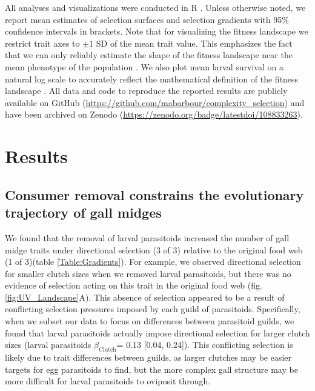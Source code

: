 \documentclass[11pt,]{article}
\begin{document}
All analyses and visualizations were conducted in R \citep{R2018}.
Unless otherwise noted, we report mean estimates of selection surfaces
and selection gradients with 95\% confidence intervals in brackets. Note
that for visualizing the fitness landscape we restrict trait axes to
\(\pm 1\) SD of the mean trait value. This emphasizes the fact that we
can only reliably estimate the shape of the fitness landscape near the
mean phenotype of the population \citep{Arnold2001}. We also plot mean
larval survival on a natural log scale to accurately reflect the
mathematical definition of the fitness landscape \citep{Arnold2003}. All
data and code to reproduce the reported results are publicly available
on GitHub (\url{https://github.com/mabarbour/complexity_selection}) and
have been archived on Zenodo
(\url{https://zenodo.org/badge/latestdoi/108833263}).

\section{Results}\label{results}

\subsection{Consumer removal constrains the evolutionary trajectory of
gall
midges}\label{consumer-removal-constrains-the-evolutionary-trajectory-of-gall-midges}

\indent We found that the removal of larval parasitoids increased the
number of gall midge traits under directional selection (3 of 3)
relative to the original food web (1 of 3)(table \ref{Table:Gradients}).
For example, we observed directional selection for smaller clutch sizes
when we removed larval parasitoids, but there was no evidence of
selection acting on this trait in the original food web (fig.
\ref{fig:UV_Landscape}A). This absence of selection appeared to be a
result of conflicting selection pressures imposed by each guild of
parasitoids. Specifically, when we subset our data to focus on
differences between parasitoid guilds, we found that larval parasitoids
actually impose directional selection for larger clutch sizes (larval
parasitoids \(\beta_{\text{Clutch}}\)= 0.13 {[}0.04, 0.24{]}). This
conflicting selection is likely due to trait differences between guilds,
as larger clutches may be easier targets for egg parasitoids to find,
but the more complex gall structure may be more difficult for larval
parasitoids to oviposit through.

\bigskip
\end{document}
